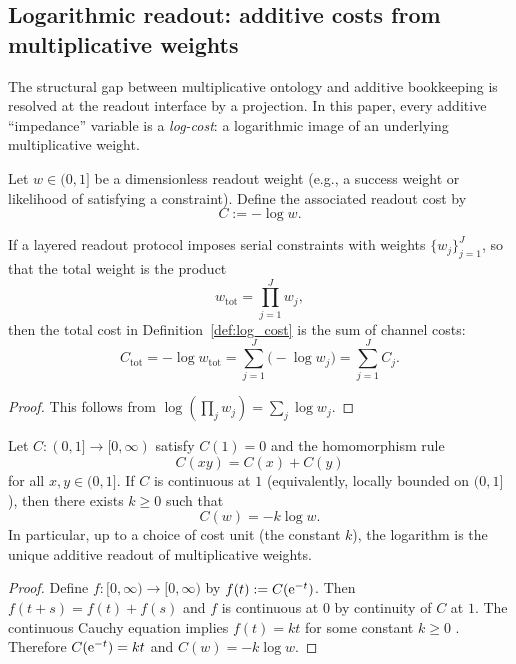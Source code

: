 \subsection{Logarithmic readout: additive costs from multiplicative weights}
The structural gap between multiplicative ontology and additive bookkeeping is resolved at the readout interface by a projection. In this paper, every additive ``impedance'' variable is a \emph{log-cost}: a logarithmic image of an underlying multiplicative weight.

\begin{definition}\label{def:log_cost}
Let $w\in(0,1]$ be a dimensionless readout weight (e.g., a success weight or likelihood of satisfying a constraint). Define the associated readout cost by
\begin{equation}
C:=-\log w.
\end{equation}
\end{definition}

\begin{proposition}\label{prop:log_readout_additivity}
If a layered readout protocol imposes serial constraints with weights $\{w_j\}_{j=1}^J$, so that the total weight is the product
\begin{equation}
w_{\mathrm{tot}}=\prod_{j=1}^J w_j,
\end{equation}
then the total cost in Definition~\ref{def:log_cost} is the sum of channel costs:
\begin{equation}
C_{\mathrm{tot}}=-\log w_{\mathrm{tot}}=\sum_{j=1}^J \big(-\log w_j\big)=\sum_{j=1}^J C_j.
\end{equation}
\end{proposition}
\begin{proof}
This follows from $\log(\prod_j w_j)=\sum_j \log w_j$.
\end{proof}

\begin{proposition}\label{prop:log_cost_uniqueness}
Let $C:(0,1]\to[0,\infty)$ satisfy $C(1)=0$ and the homomorphism rule
\begin{equation}
C(xy)=C(x)+C(y)
\end{equation}
for all $x,y\in(0,1]$. If $C$ is continuous at $1$ (equivalently, locally bounded on $(0,1]$), then there exists $k\ge 0$ such that
\begin{equation}
C(w)=-k\log w.
\end{equation}
In particular, up to a choice of cost unit (the constant $k$), the logarithm is the unique additive readout of multiplicative weights.
\end{proposition}
\begin{proof}
Define $f:[0,\infty)\to[0,\infty)$ by $f(t):=C(\mathrm{e}^{-t})$. Then $f(t+s)=f(t)+f(s)$ and $f$ is continuous at $0$ by continuity of $C$ at $1$. The continuous Cauchy equation implies $f(t)=kt$ for some constant $k\ge 0$ \cite{Aczel1966}. Therefore $C(\mathrm{e}^{-t})=kt$ and $C(w)=-k\log w$.
\end{proof}

